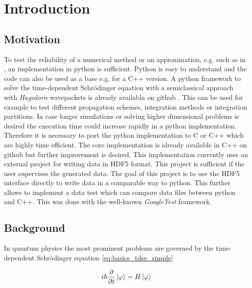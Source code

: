 \chapter{Introduction}

\section{Motivation}
To test the reliability of a numerical method or an approximation, e.g. such as in \cite{B_bachelor_thesis}, an implementation in python is sufficient. Python is easy to understand and the code can also be used as a base e.g. for a C++ version. A python framework to solve the time-dependent Schr\"odinger equation with a semiclassical approach with \textit{Hagedorn} wavepackets is already availabla on github \cite{waveblocksnd}. This can be used for example to test different propagation schemes, integration methods or integration partitions. In case longer simulations or solving higher dimensional problems is desired the execution time could increase rapidly in a python implementation. Therefore it is necessary to port the python implementation to C or C++ which are highly time efficient. The core implementation is already available in C++ on github \cite{libwaveblocks} but further improvement is desired. This implementation currently uses an external project \cite{eigen3-hdf5} for writing data in HDF5 format. This project is sufficient if the user supervises the generated data. The goal of this project is to use the HDF5 interface \cite{hdf5cppdoc} directly to write data in a comparable way to python. This further allows to implement a data test which can compare data files between python and C++. This was done with the well-known \textit{GoogleTest} \cite{googletest} framework.

\section{Background}
\label{seq:background}

In quantum physics the most prominent problems are governed by the time-dependent
Schr\"odinger equation \ref{eq:basics_tdse_simple}

\begin{equation} \label{eq:basics_tdse_simple}
  i \hbar \frac{\partial}{\partial t} \Ket{\varphi} = H \Ket{\varphi}
\end{equation}


